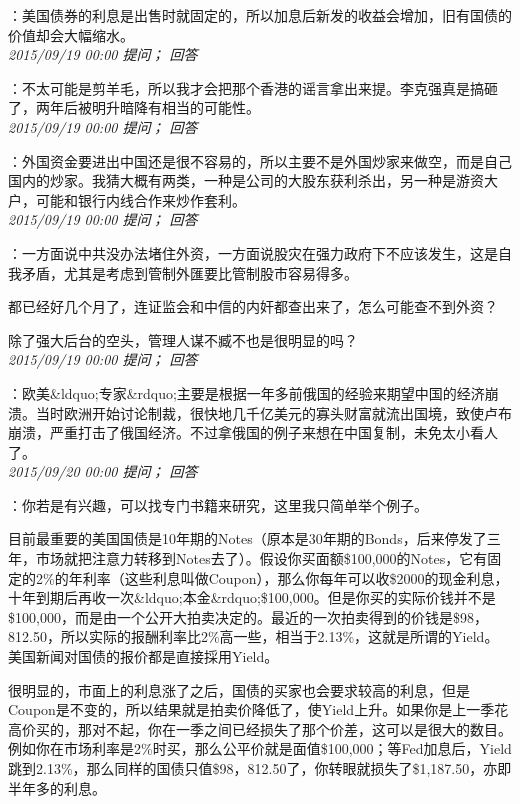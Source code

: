 \documentclass[twocolumn]{ctexart}
\begin{document}
：美国债券的利息是出售时就固定的，所以加息后新发的收益会增加，旧有国债的价值却会大幅缩水。\\

\textit{\hfill\noindent\small 2015/09/19 00:00 提问； 回答}

：不太可能是剪羊毛，所以我才会把那个香港的谣言拿出来提。李克强真是搞砸了，两年后被明升暗降有相当的可能性。\\

\textit{\hfill\noindent\small 2015/09/19 00:00 提问； 回答}

：外国资金要进出中国还是很不容易的，所以主要不是外国炒家来做空，而是自己国内的炒家。我猜大概有两类，一种是公司的大股东获利杀出，另一种是游资大户，可能和银行内线合作来炒作套利。\\

\textit{\hfill\noindent\small 2015/09/19 00:00 提问； 回答}

：一方面说中共没办法堵住外资，一方面说股灾在强力政府下不应该发生，这是自我矛盾，尤其是考虑到管制外匯要比管制股市容易得多。

都已经好几个月了，连证监会和中信的内奸都查出来了，怎么可能查不到外资？

除了强大后台的空头，管理人谋不臧不也是很明显的吗？\\

\textit{\hfill\noindent\small 2015/09/19 00:00 提问； 回答}

：欧美\&ldquo;专家\&rdquo;主要是根据一年多前俄国的经验来期望中国的经济崩溃。当时欧洲开始讨论制裁，很快地几千亿美元的寡头财富就流出国境，致使卢布崩溃，严重打击了俄国经济。不过拿俄国的例子来想在中国复制，未免太小看人了。\\

\textit{\hfill\noindent\small 2015/09/20 00:00 提问； 回答}

：你若是有兴趣，可以找专门书籍来研究，这里我只简单举个例子。

目前最重要的美国国债是10年期的Notes（原本是30年期的Bonds，后来停发了三年，市场就把注意力转移到Notes去了）。假设你买面额\$100,000的Notes，它有固定的2\%的年利率（这些利息叫做Coupon），那么你每年可以收\$2000的现金利息，十年到期后再收一次\&ldquo;本金\&rdquo;\$100,000。但是你买的实际价钱并不是\$100,000，而是由一个公开大拍卖决定的。最近的一次拍卖得到的价钱是\$98，812.50，所以实际的报酬利率比2\%高一些，相当于2.13\%，这就是所谓的Yield。美国新闻对国债的报价都是直接採用Yield。

很明显的，市面上的利息涨了之后，国债的买家也会要求较高的利息，但是Coupon是不变的，所以结果就是拍卖价降低了，使Yield上升。如果你是上一季花高价买的，那对不起，你在一季之间已经损失了那个价差，这可以是很大的数目。例如你在市场利率是2\%时买，那么公平价就是面值\$100,000；等Fed加息后，Yield跳到2.13\%，那么同样的国债只值\$98，812.50了，你转眼就损失了\$1,187.50，亦即半年多的利息。\\
\end{document}
